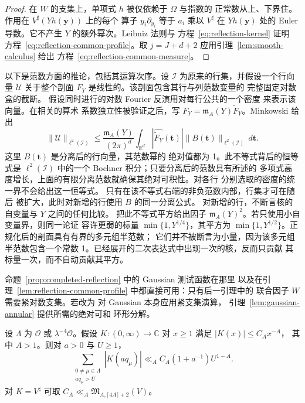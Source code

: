 \begin{proof}
在 $W$ 的支集上，单项式 $h$ 被仅依赖于 $\Omega$ 与指数的
正常数从上、下界住。作用在 $V^\sharp(Yh(\boldsymbol y))$ 上的每个
算子 $y_i\partial_{y_i}$ 等于 $a_i$ 乘以 $V^\sharp$ 在 $Yh(\boldsymbol y)$ 处的
Euler 导数。它不产生 $Y$ 的额外幂次。Leibniz 法则与
方程~\eqref{eq:reflection-kernel} 证明
方程~\eqref{eq:reflection-common-profile}。取
$j=J+d+2$ 应用引理~\ref{lem:smooth-calculus} 给出
方程~\eqref{eq:reflection-common-measure}。
\end{proof}

以下是范数方面的推论，包括其运算次序。设
$\mathcal I$ 为原来的行集，并假设一个行向量 $\mathcal U$
关于整个剖面 $F_Y$ 是线性的。该剖面包含其行与列范数变量的
完整固定对数盒的截断。
假设同时进行的对数 Fourier 反演用对每行公共的一个密度
来表示该向量。在相关的算术
系数独立性被验证之后，写
$F_Y=\mathfrak m_A(Y)\widetilde F_Y$。Minkowski 给出
\begin{equation}\label{eq:reflection-common-minkowski}
 \|\mathcal U\|_{\ell^2(\mathcal I)}
 \le \frac{\mathfrak m_A(Y)}{(2\pi)^d}
       \int_{\mathbb R^d}|\widehat{\widetilde F_Y}(\boldsymbol t)|
       \|B(\boldsymbol t)\|_{\ell^2(\mathcal I)}\,d\boldsymbol t.
\end{equation}
这里 $B(\boldsymbol t)$ 是分离后的行向量，其范数幂的
绝对值都为 1。此不等式背后的恒等式是
$\ell^2(\mathcal I)$ 中的一个 Bochner 积分；只要分离后的范数具有所述的
多项式高度增长，上面的有限分离范数就确保其绝对可积性。对各行
分别选取的密度的统一界不会给出这一恒等式。
只有在该不等式右端的非负范数内部，行集才可在随后
被扩大，此时对新增的行使用 $B$ 的同一分离公式。
对新增的行，不断言核的自变量与 $Y$ 之间的任何比较。
把此不等式平方给出因子
$\mathfrak m_A(Y)^2$。若只使用小自变量界，则同一论证
容许更弱的标量 $\min\{1,Y^{1/4}\}$，其平方为
$\min\{1,Y^{1/2}\}$。正规化后的剖面具有有界的多元组半范数；
它们并不被断言为小量，因为该多元组半范数包含一个常数
1。已经展开的二次表达式中出现一次的核，反而只贡献
其标量一次，而不自动贡献其平方。

命题~\ref{prop:completed-reflection} 中的 Gaussian 测试函数在那里
以及在引理~\ref{lem:reflection-common-profile} 中都直接可用：只有后一引理中的
联合因子 $W$ 需要紧对数支集。若改为
对 Gaussian 本身应用紧支集演算，
引理~\ref{lem:gaussian-annular} 提供所需的绝对可和
环形分解。

\begin{lemma}[格核尾部]\label{lem:lattice-kernel-tail}
设 $\Lambda$ 为 $\mathcal O$ 或 $\lambda^{-4}\mathcal O$。假设
$K:(0,\infty)\to\mathbb C$ 对 $x\ge1$ 满足 $|K(x)|\le C_Ax^{-A}$，
其中 $A>1$。则对 $a>0$ 与 $U\ge1$，
\begin{equation}\label{eq:lattice-kernel-tail}
 \sum_{\substack{0\ne\mu\in\Lambda\\a q_\mu>U}}|K(aq_\mu)|
 \ll_A C_A(1+a^{-1})U^{1-A}.
\end{equation}
对 $K=V^\sharp$ 可取
$C_A\ll_A\mathfrak M_{A,\lceil4A\rceil+2}(V)$。
\end{lemma}

